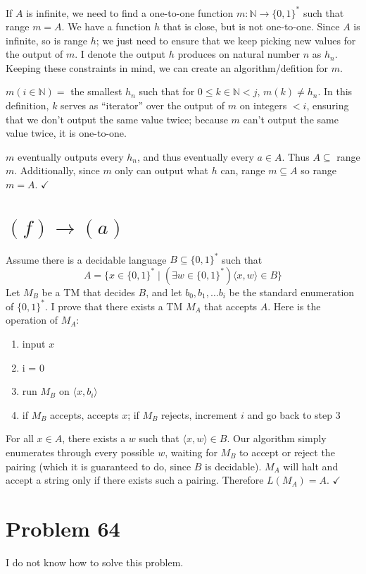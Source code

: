\documentclass[11pt]{article}
\let\imp\rightarrow
\begin{document}
If $A$ is infinite, we need to find a one-to-one function $m: \mathbb{N} \imp \{0,1\}^*$ such that range $m = A$.
We have a function $h$ that is close, but is not one-to-one.
Since $A$ is infinite, so is range $h$; we just need to ensure that we keep picking new values for the output of $m$.
I denote the output $h$ produces on natural number $n$ as $h_n$.
Keeping these constraints in mind, we can create an algorithm/defition for $m$. 

$m(i \in \mathbb{N}) = $ the smallest $h_n$ such that for $0 \leq k \in \mathbb{N} < j$, $m( k ) \neq h_n$.
In this definition, $k$ serves as ``iterator'' over the output of $m$ on integers $< i$, ensuring that we don't output the same value twice; because $m$ can't output the same value twice, it is one-to-one.

$m$ eventually outputs every $h_n$, and thus eventually every $a \in A$. 
Thus $A \subseteq $ range $m$.
Additionally, since $m$ only can output what $h$ can, range $m \subseteq A$ so range $m = A$. $\checkmark$


\section*{$(f) \imp (a)$}

Assume there is a decidable language $B \subseteq \{0,1\}^*$ such that
	\[A = \{x \in \{0,1\}^* \mid (\exists w \in \{0,1\}^*) \langle x, w \rangle \in B\}\]
Let $M_B$ be a TM that decides $B$, and let $b_0, b_1, \ldots b_i$ be the standard enumeration of $\{0,1\}^*$. 
I prove that there exists a TM $M_A$ that accepts $A$.
Here is the operation of $M_A$:
\begin{enumerate}
	\item input $x$
	\item i = 0
	\item run $M_B$ on $\langle x, b_i \rangle$ 
	\item if $M_B$ accepts, accepts $x$; if $M_B$ rejects, increment $i$ and go back to step 3
\end{enumerate}

For all $x \in A$, there exists a $w$ such that $\langle x, w \rangle \in B$.
Our algorithm simply enumerates through every possible $w$, waiting for $M_B$ to accept or reject the pairing (which it is guaranteed to do, since $B$ is decidable).
$M_A$ will halt and accept a string only if there exists such a pairing.
Therefore $L(M_A) = A$. $\checkmark$


\section*{Problem 64}
I do not know how to solve this problem.
\end{document}
